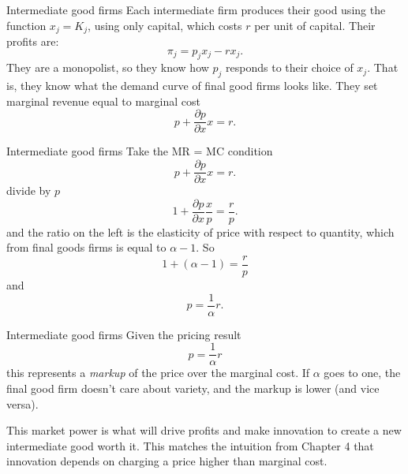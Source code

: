 \begin{frame}{Intermediate good firms}
Each intermediate firm produces their good using the function $x_j = K_j$, using only capital, which costs $r$ per unit of capital. Their profits are:
\begin{equation}
	\pi_j = p_j x_j - r x_j. \nonumber
\end{equation}
They are a monopolist, so they know how $p_j$ responds to their choice of $x_j$. That is, they know what the demand curve of final good firms looks like. They set marginal revenue equal to marginal cost
\begin{equation}
	p + \frac{\partial p}{\partial x}x = r. \nonumber
\end{equation}
\end{frame}

\begin{frame}{Intermediate good firms}
Take the MR = MC condition
\begin{equation}
	p + \frac{\partial p}{\partial x}x = r. \nonumber
\end{equation}
divide by $p$
\begin{equation}
	1 + \frac{\partial p}{\partial x}\frac{x}{p} = \frac{r}{p}. \nonumber
\end{equation}
and the ratio on the left is the elasticity of price with respect to quantity, which from final goods firms is equal to $\alpha - 1$. So
\begin{equation}
	1 + (\alpha-1) = \frac{r}{p} \nonumber
\end{equation}
and 
\begin{equation}
	p = \frac{1}{\alpha}r. \label{EQ_markup}
\end{equation}
\end{frame}

\begin{frame}{Intermediate good firms}
Given the pricing result
\begin{equation}
	p = \frac{1}{\alpha}r \label{EQ_markup}
\end{equation}
this represents a \textit{markup} of the price over the marginal cost. If $\alpha$ goes to one, the final good firm doesn't care about variety, and the markup is lower (and vice versa). 

\vspace{.25in}\noindent This market power is what will drive profits and make innovation to create a new intermediate good worth it. This matches the intuition from Chapter 4 that innovation depends on charging a price higher than marginal cost.
\end{frame}

